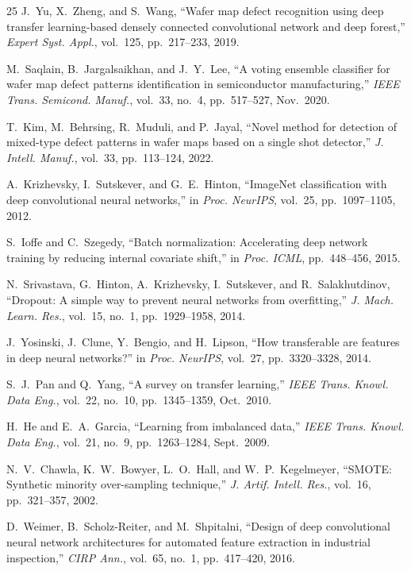 \documentclass[conference]{IEEEtran}
\begin{document}
\begin{thebibliography}{25}
J.~Yu, X.~Zheng, and S.~Wang,
``Wafer map defect recognition using deep transfer learning-based densely
connected convolutional network and deep forest,''
\textit{Expert Syst. Appl.}, vol.~125, pp.~217--233, 2019.

M.~Saqlain, B.~Jargalsaikhan, and J.~Y.~Lee,
``A voting ensemble classifier for wafer map defect patterns
identification in semiconductor manufacturing,''
\textit{IEEE Trans. Semicond. Manuf.},
vol.~33, no.~4, pp.~517--527, Nov.\ 2020.

T.~Kim, M.~Behrsing, R.~Muduli, and P.~Jayal,
``Novel method for detection of mixed-type defect patterns in wafer maps
based on a single shot detector,''
\textit{J. Intell. Manuf.}, vol.~33, pp.~113--124, 2022.

A.~Krizhevsky, I.~Sutskever, and G.~E.~Hinton,
``ImageNet classification with deep convolutional neural networks,''
in \textit{Proc. NeurIPS}, vol.~25, pp.~1097--1105, 2012.

S.~Ioffe and C.~Szegedy,
``Batch normalization: Accelerating deep network training by reducing
internal covariate shift,''
in \textit{Proc. ICML}, pp.~448--456, 2015.

N.~Srivastava, G.~Hinton, A.~Krizhevsky, I.~Sutskever, and
R.~Salakhutdinov,
``Dropout: A simple way to prevent neural networks from overfitting,''
\textit{J. Mach. Learn. Res.}, vol.~15, no.~1,
pp.~1929--1958, 2014.

J.~Yosinski, J.~Clune, Y.~Bengio, and H.~Lipson,
``How transferable are features in deep neural networks?''
in \textit{Proc. NeurIPS}, vol.~27, pp.~3320--3328, 2014.

S.~J.~Pan and Q.~Yang,
``A survey on transfer learning,''
\textit{IEEE Trans. Knowl. Data Eng.},
vol.~22, no.~10, pp.~1345--1359, Oct.\ 2010.

H.~He and E.~A.~Garcia,
``Learning from imbalanced data,''
\textit{IEEE Trans. Knowl. Data Eng.},
vol.~21, no.~9, pp.~1263--1284, Sept.\ 2009.

N.~V.~Chawla, K.~W.~Bowyer, L.~O.~Hall, and W.~P.~Kegelmeyer,
``SMOTE: Synthetic minority over-sampling technique,''
\textit{J. Artif. Intell. Res.}, vol.~16,
pp.~321--357, 2002.

D.~Weimer, B.~Scholz-Reiter, and M.~Shpitalni,
``Design of deep convolutional neural network architectures for automated
feature extraction in industrial inspection,''
\textit{CIRP Ann.}, vol.~65, no.~1, pp.~417--420, 2016.

\end{thebibliography}
\end{document}
